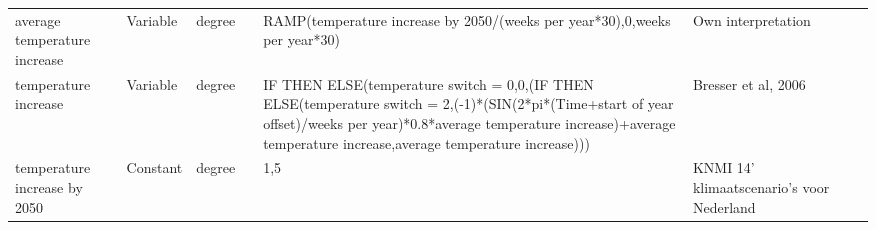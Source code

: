 \begin{landscape}
\begin{longtable}[c]{m{10em}lllm{15em}lll}
average temperature increase                  & Variable & degree                   &                           & RAMP(temperature increase by 2050/(weeks per year*30),0,weeks per year*30)                                                                                                                                                                                                               & Own interpretation                                                                                                                                                                           &                                                                                                                                                                                                                                       \\
temperature increase                          & Variable & degree                   &                           & IF THEN ELSE(temperature switch = 0,0,(IF THEN ELSE(temperature switch = 2,(-1)*(SIN(2*pi*(Time+start of year offset)/weeks per year)*0.8*average temperature increase)+average temperature increase,average temperature increase)))                                                     & Bresser et al, 2006                                                                                                                                                                          &                                                                                                                                                                                                                                       \\
temperature increase by 2050                  & Constant & degree                   &                           & 1,5                                                                                                                                                                                                                                                                                      & KNMI 14' klimaatscenario's voor Nederland                                                                                                                                                    &                                                                                                                                                                                                                                       \\

\end{longtable}
\end{landscape}
